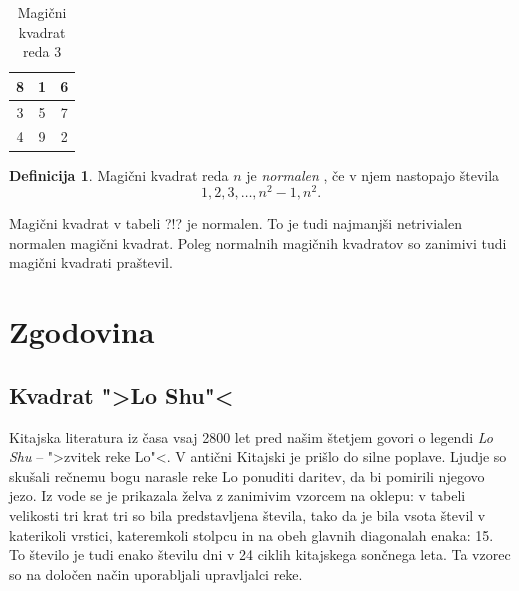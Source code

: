 \documentclass[a4paper,12pt]{article}
\newcommand{\pojem}[1]{\emph {\color{purple} #1 }}
\theoremstyle{plain}
\theoremstyle{definition}
\newtheorem{definicija}{Definicija}
\begin{document}
\begin{table}
   \centering
   \caption{Magični kvadrat reda 3}
   \label{table:mag3}
   \large
   \begin{tabular}{|c|c|c|}
      \hline
       8 & 1 & 6 \\\hline
       3 & 5 & 7 \\\hline
       4 & 9 & 2 \\\hline

      
   \end{tabular}
   \normalsize

\end{table}



\begin{definicija}
   Magični kvadrat reda $n$ je \pojem{normalen}, če v njem nastopajo števila
   \begin{equation}
      1, 2, 3, \ldots, n^2-1, n^2.
   \end{equation}
\end{definicija}

Magični kvadrat v tabeli ?!? je normalen.
To je tudi najmanjši netrivialen normalen magični kvadrat.
Poleg normalnih magičnih kvadratov so zanimivi tudi magični kvadrati praštevil.


\section{Zgodovina}

\subsection{Kvadrat ">Lo Shu"<}

Kitajska literatura iz časa vsaj 2800 let pred našim štetjem govori o legendi
\pojem{Lo Shu} -- ">zvitek reke Lo"<. V antični Kitajski je prišlo do
silne poplave. Ljudje so skušali rečnemu bogu narasle reke Lo ponuditi daritev,
da bi pomirili njegovo jezo. Iz vode se je prikazala želva z zanimivim vzorcem
na oklepu: v tabeli velikosti tri krat tri so bila predstavljena števila, tako
da je bila vsota števil v katerikoli vrstici, kateremkoli stolpcu in na obeh
glavnih diagonalah enaka: 15. To število je tudi enako številu dni v 24 ciklih
kitajskega sončnega leta. Ta vzorec so na določen način uporabljali upravljalci
reke.
\end{document}
